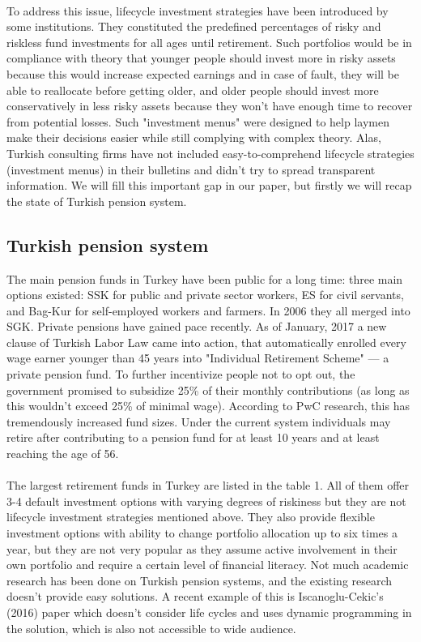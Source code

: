 \documentclass[]{article}
\begin{document}
\paragraph*{} 
To address this issue, lifecycle investment strategies have been introduced by some institutions. They constituted the predefined percentages of risky and riskless fund investments for all ages until retirement. Such portfolios would be in compliance with theory that younger people should invest more in risky assets because this would increase expected earnings and in case of fault, they will be able to reallocate before getting older, and older people should invest more conservatively in less risky assets because they won't have enough time to recover from potential losses. Such "investment menus" were designed to help laymen make their decisions easier while still complying with complex theory. Alas, Turkish consulting firms have not included easy-to-comprehend lifecycle strategies (investment menus) in their bulletins and didn't try to spread transparent information. We will fill this important gap in our paper, but firstly we will recap the state of Turkish pension system.

\subsection{Turkish pension system}
The main pension funds in Turkey have been public for a long time: three main options existed: SSK for public and private sector workers, ES for civil servants, and Bag-Kur for self-employed workers and farmers. In 2006 they all merged into SGK. Private pensions have gained pace recently. As of January, 2017 a new clause of Turkish Labor Law came into action, that automatically enrolled every wage earner younger than 45 years into "Individual Retirement Scheme" --- a private pension fund. To further incentivize people not to opt out, the government promised to subsidize 25\% of their monthly contributions (as long as this wouldn't exceed 25\% of minimal wage). According to PwC research, this has tremendously increased fund sizes. Under the current system individuals may retire after contributing to a pension fund for at least 10 years and at least reaching the age of 56.
\paragraph*{}
The largest retirement funds in Turkey are listed in the table 1. All of them offer 3-4 default investment options with varying degrees of riskiness but they are not lifecycle investment strategies mentioned above. They also provide flexible investment options with ability to change portfolio allocation up to six times a year, but they are not very popular as they assume active involvement in their own portfolio and require a certain level of financial literacy. Not much academic research has been done on Turkish pension systems, and the existing research doesn't provide easy solutions. A recent example of this is Iscanoglu-Cekic's (2016) paper which doesn't consider life cycles and uses dynamic programming in the solution, which is also not accessible to wide audience.
\end{document}
